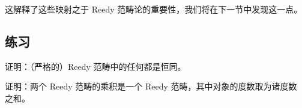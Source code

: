 这解释了这些映射之于 Reedy 范畴论的重要性，我们将在下一节中发现这一点。

\subsection*{练习}

\begin{exercise}\label{ex:reedy-isomorphism-identity}
证明：（严格的）Reedy 范畴中的任何\trIsomorphism{}都是恒同。
\end{exercise}

\begin{exercise}\label{ex:product-reedy-category}
证明：两个 Reedy 范畴的乘积是一个 Reedy 范畴，其中对象的度数取为诸度数
之和。
\end{exercise}

